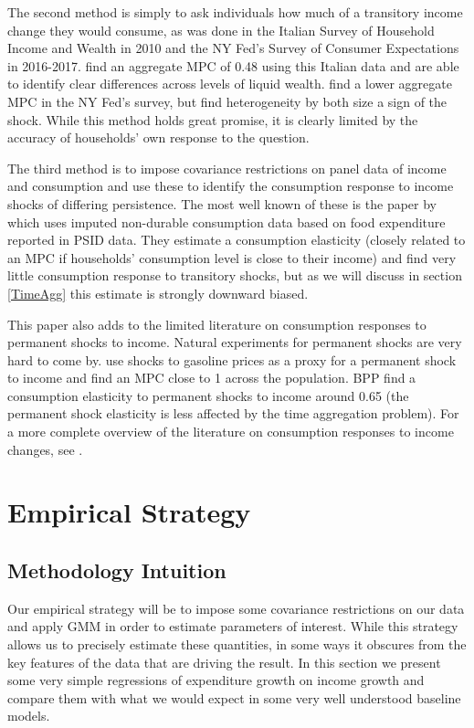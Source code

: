 \documentclass[titlepage]{\econtex}\newcommand{\texname}{ConsumptionHeterogeneity}
\begin{document}
The second method is simply to ask individuals how much of a transitory income change they would consume, as was done in the Italian Survey of Household Income and Wealth in 2010 and the NY Fed's Survey of Consumer
Expectations in 2016-2017. \cite{jappelli_fiscal_2014} find an aggregate MPC of 0.48 using this Italian data and are able to identify clear differences across levels of liquid wealth. \cite{fuster_what_2018} find a lower aggregate MPC in the NY Fed's survey, but find heterogeneity by both size a sign of the shock. While this method holds great promise, it is clearly limited by the accuracy of households' own response to the question.

The third method is to impose covariance restrictions on panel data of income and consumption and use these to identify the consumption response to income shocks of differing persistence. The most well known of these is the paper by \cite{blundell_consumption_2008} which uses imputed non-durable consumption data based on food expenditure reported in PSID data. They estimate a consumption elasticity (closely related to an MPC if households' consumption level is close to their income) and find very little consumption response to transitory shocks, but as we will discuss in section \ref{TimeAgg} this estimate is strongly downward biased.

This paper also adds to the limited literature on consumption responses to permanent shocks to income. Natural experiments for permanent shocks are very hard to come by. \cite{gelman_response_2016} use shocks to gasoline prices as a proxy for a permanent shock to income and find an MPC close to 1 across the population. BPP find a consumption elasticity to permanent shocks to income around 0.65 (the permanent shock elasticity is less affected by the time aggregation problem). For a more complete overview of the literature on consumption responses to income changes, see \cite{jappelli_consumption_2010}.

\section{Empirical Strategy} \label{empirical_strategy} 

\subsection{Methodology Intuition}
Our empirical strategy will be to impose some covariance restrictions on our data and apply GMM in order to estimate parameters of interest. While this strategy allows us to precisely estimate these quantities, in some ways it obscures from the key features of the data that are driving the result. In this section we present some very simple regressions of expenditure growth on income growth and compare them with what we would expect in some very well understood baseline models.
\end{document}
